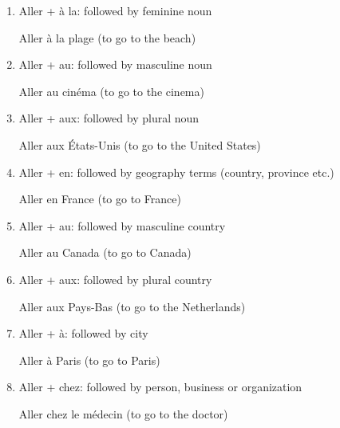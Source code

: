 \documentclass{book}
\begin{document}
        \begin{enumerate}
            \item Aller + à la: followed by feminine noun
                \begin{center}
                    Aller à la plage (to go to the beach)
                \end{center}
            \item Aller + au: followed by masculine noun
                \begin{center}
                    Aller au cinéma (to go to the cinema)
                \end{center}
            \item Aller + aux: followed by plural noun
                \begin{center}
                    Aller aux États-Unis (to go to the United States)
                \end{center}
            \item Aller + en: followed by geography terms (country, province etc.)
                \begin{center}
                    Aller en France (to go to France)
                \end{center}
            \item Aller + au: followed by masculine country
                \begin{center}
                    Aller au Canada (to go to Canada)
                \end{center}
            \item Aller + aux: followed by plural country
                \begin{center}
                    Aller aux Pays-Bas (to go to the Netherlands)
                \end{center}
            \item Aller + à: followed by city
                \begin{center}
                    Aller à Paris (to go to Paris)
                \end{center}
            \item Aller + chez: followed by person, business or organization
                \begin{center}
                    Aller chez le médecin (to go to the doctor)
                \end{center}
        \end{enumerate}
\end{document}
